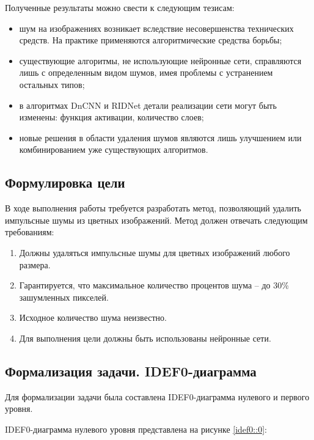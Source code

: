 Полученные результаты можно свести к следующим тезисам:
\begin{itemize}
	\item шум на изображениях возникает вследствие несовершенства технических средств. На практике применяются алгоритмические средства борьбы;
	\item существующие алгоритмы, не использующие нейронные сети, справляются лишь с определенным видом шумов, имея проблемы с устранением остальных типов;
	\item в алгоритмах DnCNN и RIDNet детали реализации сети могут быть изменены: функция активации, количество слоев;
	\item новые решения в области удаления шумов являются лишь улучшением или комбинированием уже существующих алгоритмов.
\end{itemize}

\subsection{Формулировка цели}
В ходе выполнения работы требуется разработать метод, позволяющий удалить импульсные шумы из цветных изображений. 
Метод должен отвечать следующим требованиям:
\begin{enumerate}
	\item Должны удаляться импульсные шумы для цветных изображений любого размера.
	\item Гарантируется, что максимальное количество процентов шума -- до 30\% зашумленных пикселей.
	\item Исходное количество шума неизвестно.
	\item Для выполнения цели должны быть использованы нейронные сети.
\end{enumerate}

\newpage
\subsection{Формализация задачи. IDEF0-диаграмма}
Для формализации задачи была составлена IDEF0-диаграмма нулевого и первого уровня. 

IDEF0-диаграмма нулевого уровня представлена на рисунке \ref{idef0::0}:

